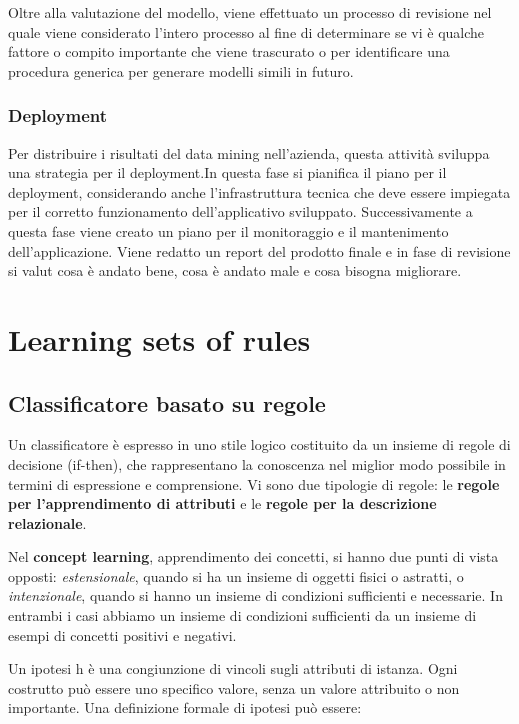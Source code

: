 \documentclass[a4paper]{extarticle}
\begin{document}
Oltre alla valutazione del modello, viene effettuato un processo di revisione nel quale viene considerato l'intero processo al fine di determinare se vi è qualche fattore o compito importante che viene trascurato o per identificare una procedura generica per generare modelli simili in futuro.

\subsubsection{Deployment}

Per distribuire i risultati del data mining nell'azienda, questa attività sviluppa una strategia per il deployment.In questa fase si pianifica il piano per il deployment, considerando anche l'infrastruttura tecnica che deve essere impiegata per il corretto funzionamento dell'applicativo sviluppato. Successivamente a questa fase viene creato un piano per il monitoraggio e il mantenimento dell'applicazione. Viene redatto un report del prodotto finale e in fase di revisione si valut cosa è andato bene, cosa è andato male e cosa bisogna migliorare.

\newpage

\section{Learning sets of rules}

\subsection{Classificatore basato su regole}

Un classificatore è espresso in uno stile logico costituito da un insieme di regole di decisione (if-then), che rappresentano la conoscenza nel miglior modo possibile in termini di espressione e comprensione. Vi sono due tipologie di regole: le \textbf{regole per l'apprendimento di attributi} e le \textbf{regole per la descrizione relazionale}.

Nel \textbf{concept learning}, apprendimento dei concetti, si hanno due punti di vista opposti: \textit{estensionale}, quando si ha un insieme di oggetti fisici o astratti, o \textit{intenzionale}, quando si hanno un insieme di condizioni sufficienti e necessarie. In entrambi i casi abbiamo un insieme di condizioni sufficienti da un insieme di esempi di concetti positivi e negativi.

Un ipotesi h è una congiunzione di vincoli sugli attributi di istanza. Ogni costrutto può essere uno specifico valore, senza un valore attribuito o non importante. Una definizione formale di ipotesi può essere:
\end{document}

